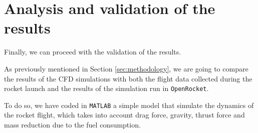 \section{Analysis and validation of the results}
\label{sec:analysis_and_validation}

Finally, we can proceed with the validation of the results.

As previously mentioned in Section \ref{sec:methodology}, we are going to compare the results of the CFD simulations with both the flight data collected during the rocket launch and the results of the simulation run in \texttt{OpenRocket}.

To do so, we have coded in \texttt{MATLAB} a simple model that simulate the dynamics of the rocket flight, which takes into account drag force, gravity, thrust force and mass reduction due to the fuel consumption.





